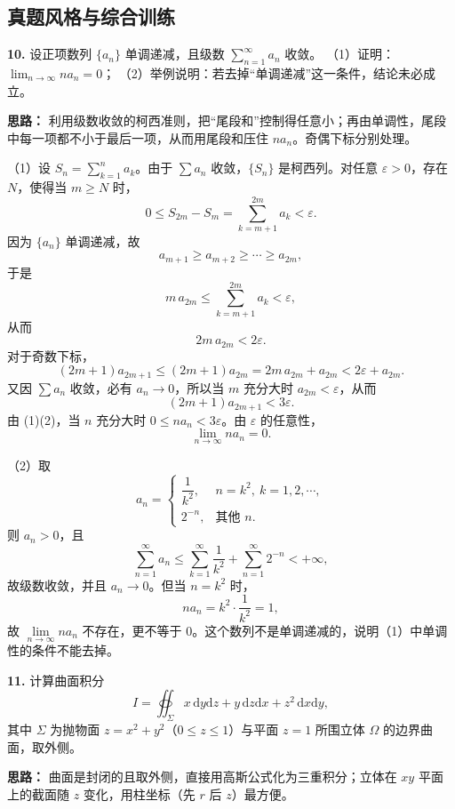 \subsection{真题风格与综合训练}

\textbf{10.} 设正项数列 $\{a_n\}$ 单调递减，且级数 $\displaystyle\sum_{n=1}^{\infty}a_n$ 收敛。
（1）证明：$\displaystyle\lim_{n\to\infty}na_n=0$；
（2）举例说明：若去掉“单调递减”这一条件，结论未必成立。

\ifshowsolutions%

\textbf{思路：} 利用级数收敛的柯西准则，把“尾段和”控制得任意小；再由单调性，尾段中每一项都不小于最后一项，从而用尾段和压住 $na_n$。奇偶下标分别处理。

（1）设 $S_n=\displaystyle\sum_{k=1}^n a_k$。由于 $\sum a_n$ 收敛，$\{S_n\}$ 是柯西列。对任意 $\varepsilon>0$，存在 $N$，使得当 $m\ge N$ 时，
\[
0\le S_{2m}-S_m=\sum_{k=m+1}^{2m}a_k<\varepsilon.
\]
因为 $\{a_n\}$ 单调递减，故
\[
a_{m+1}\ge a_{m+2}\ge\cdots\ge a_{2m},
\]
于是
\[
m\,a_{2m}\le\sum_{k=m+1}^{2m}a_k<\varepsilon,
\]
从而
\[
2m\,a_{2m}<2\varepsilon. \tag{1}
\]
对于奇数下标，
\[
(2m+1)a_{2m+1}\le(2m+1)a_{2m}
=2m\,a_{2m}+a_{2m}
<2\varepsilon+a_{2m}.
\]
又因 $\sum a_n$ 收敛，必有 $a_n\to0$，所以当 $m$ 充分大时 $a_{2m}<\varepsilon$，从而
\[
(2m+1)a_{2m+1}<3\varepsilon. \tag{2}
\]
由 (1)(2)，当 $n$ 充分大时 $0\le na_n<3\varepsilon$。由 $\varepsilon$ 的任意性，
\[
\lim_{n\to\infty}na_n=0.
\]

（2）取
\[
a_n=\begin{cases}
\dfrac{1}{k^2}, & n=k^2,\ k=1,2,\cdots,\\[4pt]
2^{-n}, & \text{其他 }n.
\end{cases}
\]
则 $a_n>0$，且
\[
\sum_{n=1}^{\infty}a_n
\le\sum_{k=1}^{\infty}\frac{1}{k^2}+\sum_{n=1}^{\infty}2^{-n}<+\infty,
\]
故级数收敛，并且 $a_n\to0$。但当 $n=k^2$ 时，
\[
n a_n=k^2\cdot\frac{1}{k^2}=1,
\]
故 $\lim\limits_{n\to\infty}na_n$ 不存在，更不等于 $0$。这个数列不是单调递减的，说明（1）中单调性的条件不能去掉。
\else \answerarea[10] \fi%

\textbf{11.} 计算曲面积分
\[
I=\oiint_{\Sigma}x\,\mathrm{d}y\mathrm{d}z+y\,\mathrm{d}z\mathrm{d}x+z^2\,\mathrm{d}x\mathrm{d}y,
\]
其中 $\Sigma$ 为抛物面 $z=x^2+y^2$（$0\le z\le1$）与平面 $z=1$ 所围立体 $\Omega$ 的边界曲面，取外侧。

\ifshowsolutions%

\textbf{思路：} 曲面是封闭的且取外侧，直接用高斯公式化为三重积分；立体在 $xy$ 平面上的截面随 $z$ 变化，用柱坐标（先 $r$ 后 $z$）最方便。

